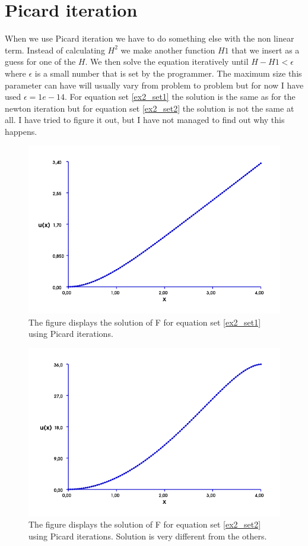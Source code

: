 \documentclass[11pt]{report}
\begin{document}
\section*{Picard iteration}

When we use Picard iteration we have to do something else with the non linear term. Instead of calculating $H^2$ we make another function $H1$ that we insert as a guess for one of the $H$. We then solve the equation iteratively until $H-H1<\epsilon$ where $\epsilon$ is a small number that is set by the programmer. The maximum size this parameter can have will usually vary from problem to problem but for now I have used $\epsilon = 1e-14$. For equation set \ref{ex2_set1} the solution is the same as for the newton iteration but for equation set \ref{ex2_set2} the solution is not the same at all. I have tried to figure it out, but I have not managed to find out why this happens.

\begin{figure}[htb]
\includegraphics[scale=0.5]{images/ex2_picard_1.png}
\caption{The figure displays the solution of F for equation set \ref{ex2_set1} using Picard iterations.}
\label{fig:ex2_newton_2}
\end{figure}

\begin{figure}[htb]
\includegraphics[scale=0.5]{images/ex2_picard_2.png}
\caption{The figure displays the solution of F for equation set \ref{ex2_set2} using Picard iterations. Solution is very different from the others.}
\label{fig:ex2_newton_2}
\end{figure}
\end{document}
